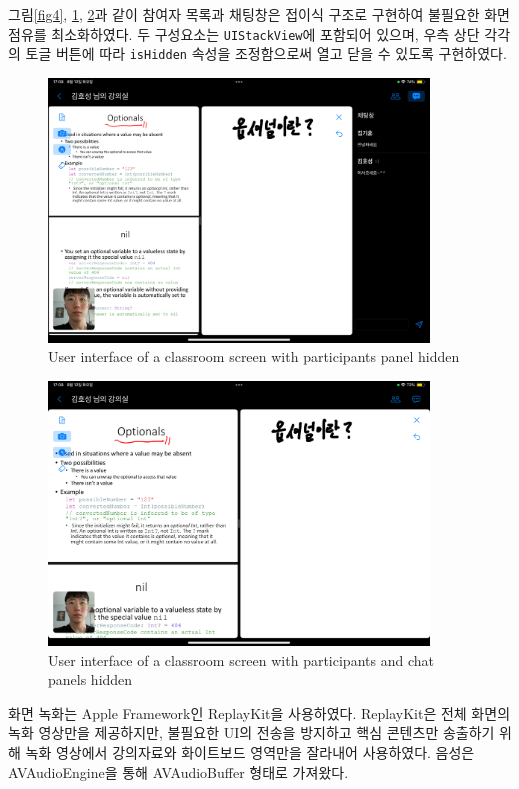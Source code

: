 \documentclass[pdflatex,sn-mathphys-num]{sn-jnl}%
\theoremstyle{thmstyleone}%
\theoremstyle{thmstyletwo}%
\theoremstyle{thmstylethree}%
\begin{document}
그림\ref{fig4}, \ref{fig5}, \ref{fig6}과 같이 참여자 목록과 채팅창은 접이식 구조로 구현하여 불필요한 화면 점유를 최소화하였다. 두 구성요소는 \verb+UIStackView+에 포함되어 있으며, 우측 상단 각각의 토글 버튼에 따라 \verb+isHidden+ 속성을 조정함으로써 열고 닫을 수 있도록 구현하였다.

\begin{figure}[H]
\centering
\includegraphics[width=0.9\textwidth]{room1.PNG}
\caption{User interface of a classroom screen with participants panel hidden}\label{fig5}
\end{figure}

\begin{figure}[H]
\centering
\includegraphics[width=0.9\textwidth]{room2.PNG}
\caption{User interface of a classroom screen with participants and chat panels hidden}\label{fig6}
\end{figure}

\noindent
화면 녹화는 Apple Framework인 ReplayKit\cite{ReplayKit}을 사용하였다. ReplayKit은 전체 화면의 녹화 영상만을 제공하지만, 불필요한 UI의 전송을 방지하고 핵심 콘텐츠만 송출하기 위해 녹화 영상에서 강의자료와 화이트보드 영역만을 잘라내어 사용하였다. 음성은 AVAudioEngine을 통해 AVAudioBuffer 형태로 가져왔다.
\end{document}
